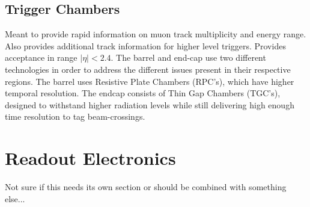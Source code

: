     \subsection{Trigger Chambers}
        Meant to provide rapid information on muon track multiplicity and energy range.
        Also provides additional track information for higher level triggers.
        Provides acceptance in range $|\eta| < 2.4$.
        The barrel and end-cap use two different technologies in order to address the different issues present in their respective regions.
        The barrel uses Resistive Plate Chambers (RPC's), which have higher temporal resolution. The endcap consists of Thin Gap Chambers (TGC's), designed to withstand higher radiation levels while still delivering high enough time resolution to tag beam-crossings.




\section{Readout Electronics} %
    Not sure if this needs its own section or should be combined with something else...

